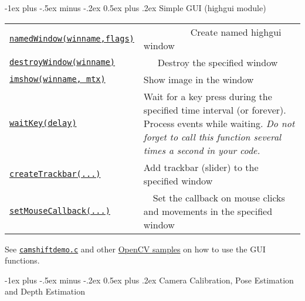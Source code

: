 \documentclass[10pt,landscape]{article}
\makeatletter
\renewcommand{\section}{\@startsection{section}{1}{0mm}%
                                {-1ex plus -.5ex minus -.2ex}%
                                {0.5ex plus .2ex}%
                                {\normalfont\large\bfseries}}
\makeatother
\begin{document}
\begin{multicols}{3}
\section{Simple GUI (highgui module)}

\begin{tabular}{@{}p{\the\MyLen}%
                @{}p{\linewidth-\the\MyLen}@{}}

\texttt{\href{http://opencv.willowgarage.com/documentation/cpp/user_interface.html\#cv-namedwindow}{namedWindow(winname,flags)}} & \ \ \ \ \ \ \ \ \ \ Create named highgui window \\

\texttt{\href{http://opencv.willowgarage.com/documentation/cpp/user_interface.html\#cv-destroywindow}{destroyWindow(winname)}} & \ \ \ Destroy the specified window \\

\texttt{\href{http://opencv.willowgarage.com/documentation/cpp/user_interface.html\#cv-imshow}{imshow(winname, mtx)}} & Show image in the window \\

\texttt{\href{http://opencv.willowgarage.com/documentation/cpp/user_interface.html\#cv-waitKey}{waitKey(delay)}} & Wait for a key press during the specified time interval (or forever). Process events while waiting. \emph{Do not forget to call this function several times a second in your code.} \\

\texttt{\href{http://opencv.willowgarage.com/documentation/cpp/user_interface.html\#cv-createTrackbar}{createTrackbar(...)}} & Add trackbar (slider) to the specified window \\

\texttt{\href{http://opencv.willowgarage.com/documentation/cpp/user_interface.html\#cv-setmousecallback}{setMouseCallback(...)}} & \ \ Set the callback on mouse clicks and movements in the specified window \\

\end{tabular}

See \texttt{\href{https://code.ros.org/svn/opencv/trunk/opencv/samples/c/camshiftdemo.c}{camshiftdemo.c}} and other \href{https://code.ros.org/svn/opencv/trunk/opencv/samples/}{OpenCV samples} on how to use the GUI functions.   

\section{Camera Calibration, Pose Estimation and Depth Estimation}


\end{multicols}
\end{document}
